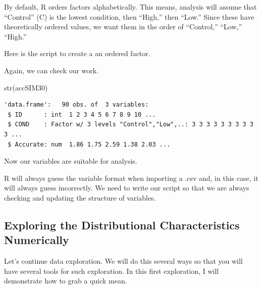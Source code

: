 \documentclass[
  english,
]{book}
\newenvironment{Shaded}{\begin{snugshade}}{\end{snugshade}}
\newcommand{\AttributeTok}[1]{\textcolor[rgb]{0.77,0.63,0.00}{#1}}
\newcommand{\FunctionTok}[1]{\textcolor[rgb]{0.00,0.00,0.00}{#1}}
\newcommand{\NormalTok}[1]{#1}
\newcommand{\OtherTok}[1]{\textcolor[rgb]{0.56,0.35,0.01}{#1}}
\newcommand{\SpecialCharTok}[1]{\textcolor[rgb]{0.00,0.00,0.00}{#1}}
\newcommand{\StringTok}[1]{\textcolor[rgb]{0.31,0.60,0.02}{#1}}
\begin{document}
By default, R orders factors alphabetically. This means, analysis will assume that ``Control'' (C) is the lowest condition, then ``High,'' then ``Low.'' Since these have theoretically ordered values, we want them in the order of ``Control,'' ``Low,'' ``High.''

Here is the script to create a an ordered factor.

\begin{Shaded}
\end{Shaded}

Again, we can check our work.

\begin{Shaded}
\begin{Highlighting}[]
\FunctionTok{str}\NormalTok{(accSIM30)}
\end{Highlighting}
\end{Shaded}

\begin{verbatim}
'data.frame':   90 obs. of  3 variables:
 $ ID      : int  1 2 3 4 5 6 7 8 9 10 ...
 $ COND    : Factor w/ 3 levels "Control","Low",..: 3 3 3 3 3 3 3 3 3 3 ...
 $ Accurate: num  1.86 1.75 2.59 1.38 2.03 ...
\end{verbatim}

Now our variables are suitable for analysis.

R will always guess the variable format when importing a .csv and, in this case, it will always guess incorrectly. We need to write our script so that we are always checking and updating the structure of variables.

\hypertarget{exploring-the-distributional-characteristics-numerically}{%
\subsection{Exploring the Distributional Characteristics Numerically}\label{exploring-the-distributional-characteristics-numerically}}

Let's continue data exploration. We will do this several ways so that you will have several tools for such exploration. In this first exploration, I will demonstrate how to grab a quick mean.
\end{document}
